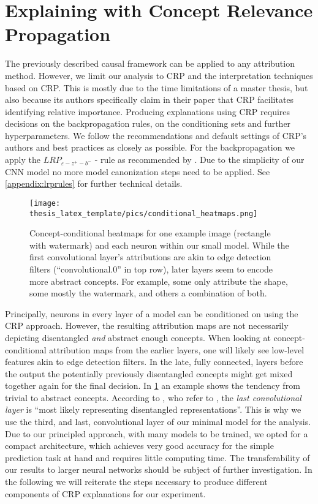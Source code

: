 \section{Explaining with Concept Relevance Propagation}\label{section:explanations_with_crp}
The previously described causal framework can be applied to any attribution method. However, we limit our analysis to CRP and the interpretation techniques based on CRP. This is mostly due to the time limitations of a master thesis, but also because its authors specifically claim in their paper that CRP facilitates identifying relative importance. 
Producing explanations using CRP requires decisions on the backpropagation rules, on the conditioning sets and further hyperparameters. 
We follow the recommendations and default settings of CRP's authors \citep{Achtibat2022, Achtibat2023} and best practices \citep{Kohlbrenner2020} as closely as possible.
For the backpropagation we apply the $LRP_{\varepsilon -z^+- b^-}$ - rule as recommended by \cite{Kohlbrenner2020}. Due to the simplicity of our CNN model no more model canonization steps need to be applied. See \cref{appendix:lrprules} for further technical details. 

\begin{figure}[t!]
    \centering
    \texttt{[image: thesis\_latex\_template/pics/conditional\_heatmaps.png]}
    \caption[Conditional Attribution Maps per Layer]{Concept-conditional heatmaps for one example image (rectangle with watermark) and each neuron within our small model. While the first convolutional layer's attributions are akin to edge detection filters (``convolutional.0'' in top row), later layers seem to encode more abstract concepts. For example, some only attribute the shape, some mostly the watermark, and others a combination of both.}
    \label{fig:cc_heatmaps}
\end{figure}

Principally, neurons in every layer of a model can be conditioned on using the CRP approach. However, the resulting attribution maps are not necessarily depicting disentangled \textit{and} abstract enough concepts. When looking at concept-conditional attribution maps from the earlier layers, one will likely see low-level features akin to edge detection filters. In the late, fully connected, layers before the output the potentially previously disentangled concepts might get mixed together again for the final decision. In \cref{fig:cc_heatmaps} an example shows the tendency from trivial to abstract concepts. 
According to \cite{Dreyer2023a}, who refer to \cite{Zeiler2013}, the \textit{last convolutional layer} is ``most likely representing disentangled representations''. This is why we use the third, and last, convolutional layer of our minimal model for the analysis.  
Due to our principled approach, with many models to be trained, we opted for a compact architecture, which achieves very good accuracy for the simple prediction task at hand and requires little computing time. The transferability of our results to larger neural networks should be subject of further investigation.
In the following we will reiterate the steps necessary to produce different components of CRP explanations for our experiment.

